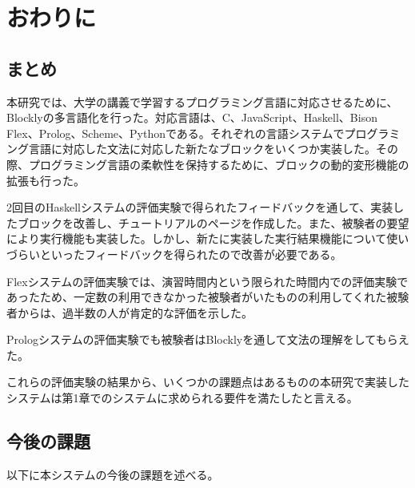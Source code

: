 \documentclass{risepaper}
\begin{document}
   \chapter{おわりに}
   
   \section{まとめ}
   
本研究では、大学の講義で学習するプログラミング言語に対応させるために、Blocklyの多言語化を行った。対応言語は、C、JavaScript、Haskell、Bison Flex、Prolog、Scheme、Pythonである。それぞれの言語システムでプログラミング言語に対応した文法に対応した新たなブロックをいくつか実装した。その際、プログラミング言語の柔軟性を保持するために、ブロックの動的変形機能の拡張も行った。

2回目のHaskellシステムの評価実験で得られたフィードバックを通して、実装したブロックを改善し、チュートリアルのページを作成した。また、被験者の要望により実行機能も実装した。しかし、新たに実装した実行結果機能について使いづらいといったフィードバックを得られたので改善が必要である。

Flexシステムの評価実験では、演習時間内という限られた時間内での評価実験であったため、一定数の利用できなかった被験者がいたものの利用してくれた被験者からは、過半数の人が肯定的な評価を示した。

Prologシステムの評価実験でも被験者はBlocklyを通して文法の理解をしてもらえた。

これらの評価実験の結果から、いくつかの課題点はあるものの本研究で実装したシステムは第1章でのシステムに求められる要件を満たしたと言える。

   \section{今後の課題}
   
以下に本システムの今後の課題を述べる。
   
\end{document}
